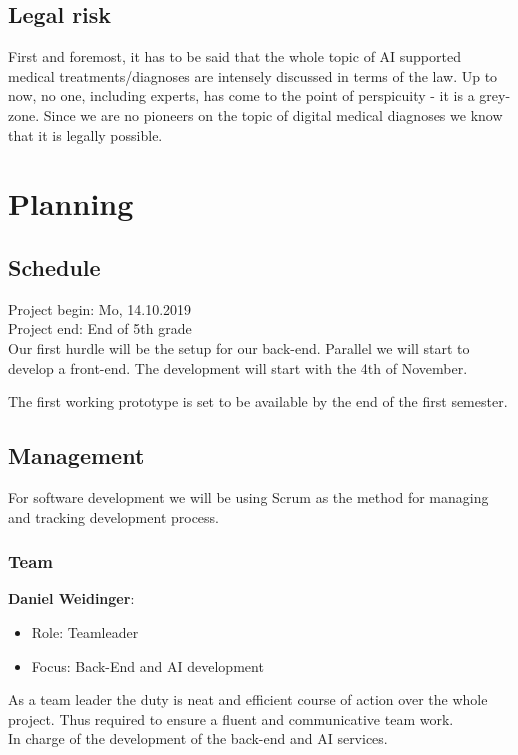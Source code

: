 \documentclass[12pt]{article}
\theoremstyle{definition}
\begin{document}
\subsection{Legal risk}

First and foremost, it has to be said that the whole topic of AI supported medical treatments/diagnoses are intensely discussed in terms of the law. Up to now, no one, including experts, has come to the point of perspicuity - it is a grey-zone. Since we are no pioneers on the topic of digital medical diagnoses we know that it is legally possible.


\pagebreak


\section{Planning}

\subsection{Schedule}

Project begin: Mo, 14.10.2019\\
Project end: End of 5th grade\\

Our first hurdle will be the setup for our back-end. Parallel we will start to develop a front-end. The development will start with the 4th of November.

The first working prototype is set to be available by the end of the first semester. 

\subsection{Management}

For software development we will be using Scrum as the method for managing and tracking development process. 

\subsubsection{Team}
    {\bf Daniel Weidinger}:
    \begin{itemize}
        \item Role: Teamleader
        \item Focus: Back-End and AI development
    \end{itemize}
    As a team leader the duty is neat and efficient course of action over the whole project. Thus required to ensure a fluent and communicative team work.\\
    In charge of the development of the back-end and AI services.
    
\end{document}
